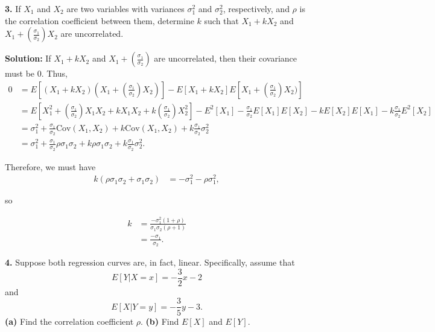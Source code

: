 \documentclass{article}
\newcommand{\mybox}{%
    \collectbox{%
        \setlength{\fboxsep}{1pt}%
        \fbox{\BOXCONTENT}%
    }%
}
\begin{document}
\pagebreak

\noindent\mybox{\textbf{3.}}  If $X_1$ and $X_2$ are two variables with variances $\sigma_1^2$ and $\sigma_2^2$, respectively, and $\rho$ is the correlation coefficient between them, determine $k$ such that $X_1+kX_2$ and $X_1+\left(\frac{\sigma_1}{\sigma_2}\right)X_2$ are uncorrelated.

\vspace{5mm}

\noindent\mybox{\textbf{Solution:}}  If $X_1+kX_2$ and $X_1+\left(\frac{\sigma_1}{\sigma_2}\right)$ are uncorrelated, then their covariance must be $0$.  Thus,
\begin{align}
0 &= E\left[(X_1+kX_2)\left(X_1+\left(\frac{\sigma_1}{\sigma_2}\right)X_2\right)\right] - E[X_1+kX_2]E[X_1+\left(\frac{\sigma_1}{\sigma_2}\right)X_2)] \\
&= E\left[X_1^2 + \left(\frac{\sigma_1}{\sigma_2}\right)X_1X_2+kX_1X_2+k\left(\frac{\sigma_1}{\sigma_2}\right)X_2^2\right] - E^2[X_1]-\frac{\sigma_1}{\sigma_2}E[X_1]E[X_2]-kE[X_2]E[X_1]-k\frac{\sigma_1}{\sigma_2}E^2[X_2] \\
&=\sigma_1^2+\frac{\sigma_1}{\sigma_2}\text{Cov}(X_1,X_2) + k\text{Cov}(X_1,X_2) + k\frac{\sigma_1}{\sigma_2}\sigma_2^2 \\
&= \sigma_1^2+\frac{\sigma_1}{\sigma_2}\rho\sigma_1\sigma_2 + k\rho\sigma_1\sigma_2 + k\frac{\sigma_1}{\sigma_2}\sigma_2^2.
\end{align}

\noindent Therefore, we must have 
\begin{align}
k\left(\rho\sigma_1\sigma_2+\sigma_1\sigma_2\right) &= -\sigma_1^2-\rho\sigma_1^2, 
\end{align}

\noindent so 

\begin{align}
k &= \frac{-\sigma_1^2(1+\rho)}{\sigma_1\sigma_2(\rho+1)} \\
&=\frac{-\sigma_1}{\sigma_2}.
\end{align}

\pagebreak

\noindent\mybox{\textbf{4.}}  Suppose both regression curves are, in fact, linear.  Specifically, assume that $$E[Y|X=x] = -\frac{3}{2}x-2$$ and $$E[X|Y=y] = -\frac{3}{5}y-3.$$  \textbf{(a)}  Find the correlation coefficient $\rho$.  \textbf{(b)}  Find $E[X]$ and $E[Y]$.  

\vspace{5mm}
\end{document}
